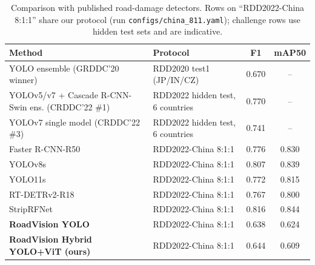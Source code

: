 \begin{table}[t]\centering\caption{Comparison with published road-damage detectors. Rows on ``RDD2022-China 8:1:1'' share our protocol (run \texttt{configs/china\_811.yaml}); challenge rows use hidden test sets and are indicative.}\label{tab:bench}
\begin{tabular}{llcc}\toprule Method & Protocol & F1 & mAP50 \\ \midrule
YOLO ensemble (GRDDC'20 winner) & RDD2020 test1 (JP/IN/CZ) & 0.670 & -- \\
YOLOv5/v7 + Cascade R-CNN-Swin ens. (CRDDC'22 \#1) & RDD2022 hidden test, 6 countries & 0.770 & -- \\
YOLOv7 single model (CRDDC'22 \#3) & RDD2022 hidden test, 6 countries & 0.741 & -- \\
Faster R-CNN-R50 & RDD2022-China 8:1:1 & 0.776 & 0.830 \\
YOLOv8s & RDD2022-China 8:1:1 & 0.807 & 0.839 \\
YOLO11s & RDD2022-China 8:1:1 & 0.772 & 0.815 \\
RT-DETRv2-R18 & RDD2022-China 8:1:1 & 0.767 & 0.800 \\
StripRFNet & RDD2022-China 8:1:1 & 0.816 & 0.844 \\
\textbf{RoadVision YOLO} & RDD2022-China 8:1:1 & 0.638 & 0.624 \\
\textbf{RoadVision Hybrid YOLO+ViT (ours)} & RDD2022-China 8:1:1 & 0.644 & 0.609 \\
\bottomrule\end{tabular}\end{table}
